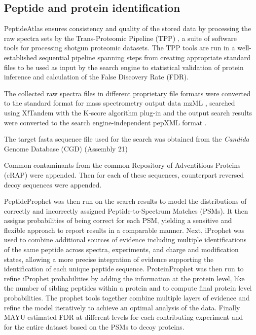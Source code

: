 \subsection*{Peptide and protein identification}

PeptideAtlas ensures consistency and quality of the stored data
by processing the raw spectra sets by the Trans-Proteomic
Pipeline (TPP) \citep{Deutsch2010c}, a suite of software tools for processing
shotgun proteomic datasets. The TPP tools are run in a well-
established sequential pipeline spanning steps from creating
 appropriate standard files to be used as input by the
search engine to statistical validation of protein inference
and calculation of the False Discovery Rate (FDR).

The collected raw spectra files in different proprietary file
formats were converted to the standard format for mass
spectrometry output data mzML \citep{Martens2011}, searched using X!Tandem
\citep{Craig2004} with the K-score algorithm plug-in \citep{MacLean2006} and the output search
results were converted to the search engine-independent
pepXML format \citep{Keller2005}.

The target fasta sequence file used for the search was
obtained from the \textit{Candida} Genome Database (CGD) \citep{Costanzo2006a} (Assembly 21)

Common contaminants from the common Repository of
Adventitious Proteins (cRAP) were appended. Then for each of
these sequences, counterpart reversed decoy sequences were
appended.

PeptideProphet \citep{Keller2002} was then run on the search results to
model the distributions of correctly and incorrectly assigned
Peptide-to-Spectrum Matches (PSMs). It then assigns probabilities
of being correct for each PSM, yielding a sensitive and flexible
approach to report results in a comparable manner. Next,
iProphet \citep{Shteynberg2011} was used to combine additional sources of evidence
including multiple identifications of the same peptide across
spectra, experiments, and charge and modification states,
allowing a more precise integration of evidence supporting the
identification of each unique peptide sequence. ProteinProphet
\citep{Nesvizhskii2003} was then run to refine iProphet probabilities by adding the
information at the protein level, like the number of sibling
peptides within a protein and to compute final protein level
probabilities. The prophet tools together combine multiple layers
of evidence and refine the model iteratively to achieve an optimal
analysis of the data. Finally MAYU \citep{Reiter2009} estimated FDR at different
levels for each contributing experiment and for the entire dataset
based on the PSMs to decoy proteins.

